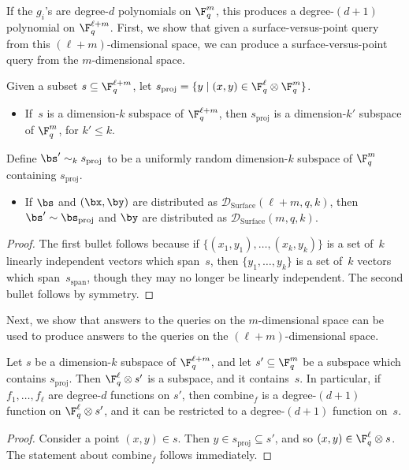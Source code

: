 \documentclass[11pt]{article}
\begin{document}
If the $g_i$'s are degree-$d$ polynomials on $\F_q^m$, this produces a degree-$(d+1)$ polynomial on $\F_q^{\ell + m}$.
First, we show that given a surface-versus-point query from this $(\ell + m)$-dimensional space,
we can produce a surface-versus-point query from the $m$-dimensional space.

\begin{proposition}\label{prop:really-the-same-dist}
Given a subset $s \subseteq \F_q^{\ell + m}$, let $s_{\mathrm{proj}} = \{y \mid (x, y) \in \F_q^{\ell} \otimes \F_q^m\}$.
\begin{itemize}
\item[$\circ$] If~$s$ is a dimension-$k$ subspace of $\F_q^{\ell+m}$, then $s_{\mathrm{proj}}$ is a dimension-$k'$ subspace of $\F_q^{m}$, for $k' \leq k$.
\end{itemize}
Define $\bs' \sim_k s_{\mathrm{proj}}$ to be a uniformly random dimension-$k$ subspace of $\F_q^{m}$ containing $s_{\mathrm{proj}}$.
\begin{itemize}
\item[$\circ$] If $\bs$ and $(\bx, \by)$ are distributed as $\mathscr{D}_{\mathrm{Surface}}(\ell + m,q,k)$,
		then $\bs' \sim \bs_{\mathrm{proj}}$ and $\by$ are distributed as $\mathscr{D}_{\mathrm{Surface}}(m, q, k)$.
\end{itemize}
\end{proposition}
\begin{proof}
The first bullet follows because if $\{(x_1, y_1), \ldots, (x_k, y_k)\}$ is a set of~$k$ linearly independent vectors which span~$s$,
then $\{y_1, \ldots, y_k\}$ is a set of~$k$ vectors which span~$s_{\mathrm{span}}$, though they may no longer be linearly independent.
The second bullet follows by symmetry.
\end{proof}

Next, we show that answers to the queries on the $m$-dimensional space
can be used to produce answers to the queries on the $(\ell+m)$-dimensional space.

\begin{proposition}\label{prop:sub-subspace}
Let $s$ be a dimension-$k$ subspace of $\F_q^{\ell + m}$, and let $s' \subseteq \F_q^{m}$ be a subspace which contains $s_{\mathrm{proj}}$.
Then $\F_q^\ell \otimes s'$ is a subspace, and it contains~$s$.
In particular, if $f_1, \ldots, f_\ell$ are degree-$d$ functions on $s'$, then $\mathrm{combine}_f$ is a degree-$(d+1)$ function on $\F_q^\ell \otimes s'$,
and it can be restricted to a degree-$(d+1)$ function on~$s$.
\end{proposition}
\begin{proof}
Consider a point $(x, y) \in s$. Then $y \in s_{\mathrm{proj}} \subseteq s'$, and so $(x, y) \in \F_q^{\ell} \otimes s$.
The statement about $\mathrm{combine}_f$ follows immediately.
\end{proof}
\end{document}
